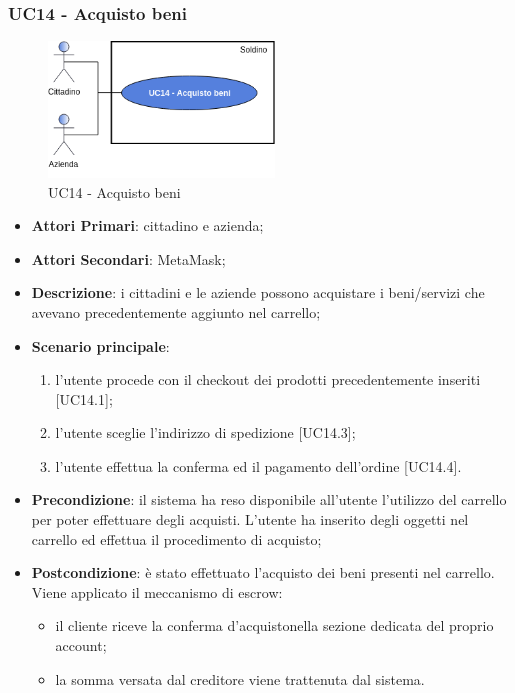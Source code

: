 \subsubsection{UC14 - Acquisto beni}
\begin{figure}[H]
	\includegraphics[width=6cm]{res/images/UC7.png}
	\centering
	\caption{UC14 - Acquisto beni}
\end{figure}
\begin{itemize}
	\item \textbf{Attori Primari}: cittadino e azienda;
	\item \textbf{Attori Secondari}: MetaMask\glo;
	\item \textbf{Descrizione}: i cittadini e le aziende possono acquistare i beni/servizi che avevano precedentemente aggiunto nel carrello;
	\item \textbf{Scenario principale}: 
	\begin{enumerate}[label=\alph*.]
		\item l'utente procede con il checkout dei prodotti precedentemente inseriti [UC14.1];
		\item l'utente sceglie l'indirizzo di spedizione [UC14.3];
		\item l'utente effettua la conferma ed il pagamento dell'ordine [UC14.4].
	\end{enumerate}
	
	\item \textbf{Precondizione}: il sistema ha reso disponibile all'utente l'utilizzo del carrello per poter effettuare degli acquisti. L'utente ha inserito degli oggetti nel carrello ed effettua il procedimento di acquisto;
	\item \textbf{Postcondizione}: è stato effettuato l'acquisto dei beni presenti nel carrello. Viene applicato il meccanismo di escrow\glo: 
	\begin{itemize}
		\item il cliente riceve la conferma d'acquisto\glosp nella sezione dedicata del proprio account;
		\item la somma versata dal creditore viene trattenuta dal sistema.
	\end{itemize} 
\end{itemize} 
